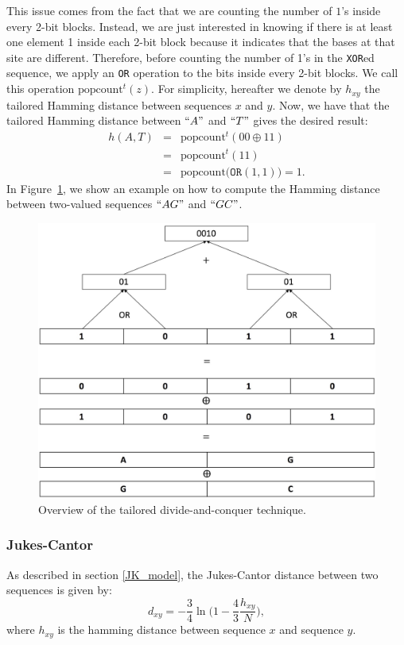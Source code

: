 This issue comes from the fact that we are counting the number of $1$'s inside every 2-bit blocks. Instead, we are just interested in knowing if there is at least one element 1 inside each 2-bit block because it indicates that the bases at that site are different. Therefore, before counting the number of 1's in the \texttt{XOR}ed sequence, we apply an \texttt{OR} operation to the bits inside every 2-bit blocks. We call this operation $\text{popcount}^t(z)$. For simplicity, hereafter we denote by $h_{xy}$ the tailored Hamming distance between sequences $x$ and $y$. Now, we have that the tailored Hamming distance between $``A"$ and $``T"$ gives the desired result:
\begin{eqnarray*}
h(A, T) &=& \text{popcount}^t(00 \oplus 11)\\
&=& \text{popcount}^t(11) \\
&=& \text{popcount}\big(\texttt{OR}(1,1)\big) = 1.
\end{eqnarray*} In Figure~\ref{fig:hamming_divide}, we show an example on how to compute the Hamming distance between two-valued sequences $``AG"$ and $``GC"$.

\begin{figure}[h]
    \centering
    \includegraphics[scale=0.12]{Chapter_PrivatePhylogeneticTrees/divide-and-conquer-tailored.jpeg}
    \caption{Overview of the tailored divide-and-conquer technique.}
    \label{fig:hamming_divide}
\end{figure}


\subsubsection{Jukes-Cantor} 
As described in section \ref{JK_model}, the Jukes-Cantor distance between two sequences is given by:
$$d_{xy} = -\frac{3}{4} \ln \Big(1- \frac{4}{3}\frac{h_{xy}}{N}\Big),$$
where $h_{xy}$ is the hamming distance between sequence $x$ and sequence $y$.

